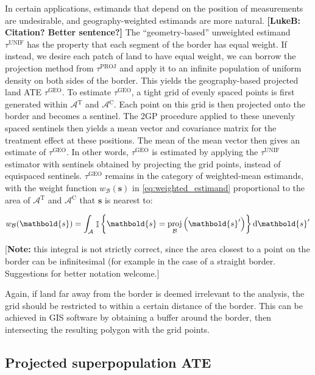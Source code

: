 \documentclass[letter]{article}
\DeclareMathOperator{\Ind}{\mathbb{I}}
\newcommand{\area}{\mathcal{A}}
\newcommand{\treat}{\mathrm{T}}
\newcommand{\ctrol}{\mathrm{C}}
\newcommand{\treatarea}{\area{}^{\treat}}
\newcommand{\ctrolarea}{\area{}^{\ctrol}}
\newcommand{\svec}{\mathbold{s}}
\newcommand{\boundary}{\mathcal{B}}
\newcommand{\unifavg}{\tau^{\mathrm{UNIF}}}
\newcommand{\tauproj}{\tau^{\mathrm{PROJ}}}
\newcommand{\taugeo}{\tau^{\mathrm{GEO}}}
\DeclareMathOperator{\proj}{proj}
\newcommand{\weightb}{w_{\boundary}}
\begin{document}
In certain applications, estimands that depend on the position of measurements are undesirable, and geography-weighted estimands are more natural. \textbf{{[}LukeB: Citation? Better sentence?{]}}
The ``geometry-based'' unweighted estimand \(\unifavg\) has the property that each segment of the border has equal weight.
If instead, we desire each patch of land to have equal weight, we can borrow the projection method from \(\tauproj\) and apply it to an infinite population of uniform density on both sides of the border.
This yields the geography-based projected land ATE \(\taugeo\).
To estimate \(\taugeo\), a tight grid of evenly spaced points is first generated within \(\treatarea\) and \(\ctrolarea\).
Each point on this grid is then projected onto the border and becomes a sentinel.
The 2GP procedure applied to these unevenly spaced sentinels then yields a mean vector and covariance matrix for the treatment effect at these positions.
The mean of the mean vector then gives an estimate of \(\taugeo\).
In other words, \(\taugeo\) is estimated by applying the \(\unifavg\) estimator with sentinels obtained by projecting the grid points, instead of equispaced sentinels.
\(\taugeo\) remains in the category of weighted-mean estimands, with the weight function \(\weightb(\svec)\) in \eqref{eq:weighted_estimand} proportional to the area of \(\treatarea\) and \(\ctrolarea\) that \(\svec\) is nearest to:

\begin{equation}
\weightb(\svec) = \int_{\area} \left. \Ind \cbr{\svec = \proj_{\boundary}\del{\svec'}} \dif \svec' \right.
\end{equation}

{[}\textbf{Note:} this integral is not strictly correct, since the area closest to a point on the border can be infinitesimal (for example in the case of a straight border. Suggestions for better notation welcome.{]}

Again, if land far away from the border is deemed irrelevant to the analysis, the grid should be restricted to within a certain distance of the border.
This can be achieved in GIS software by obtaining a buffer around the border, then intersecting the resulting polygon with the grid points.
    


    	\subsection{Projected superpopulation ATE}\label{projected-superpopulation-ate}
\end{document}
